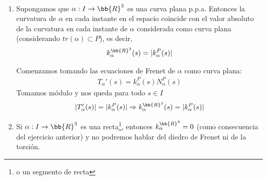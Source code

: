 \begin{ejercicio}\
    \begin{enumerate}
        \item Supongamos que $\alpha : I \to \bb{R}^3$ es una curva plana p.p.a. Entonces la curvatura de $\alpha$ en cada instante en el espacio coincide con el valor absoluto de la curvatura en cada instante de $\alpha$ considerada como curva plana (considerando $tr(\alpha)\subset P$), es decir, 
        \begin{gather*}
            k^{\bb{R}^3}_\alpha(s) = |k_\alpha^P(s)|
        \end{gather*}

        Comenzamos tomando las ecuaciones de Frenet de $\alpha$ como curva plana:
        \begin{gather*}
            T_\alpha'(s) = k_\alpha^P(s)N_\alpha^P(s)
        \end{gather*}
        Tomamos módulo y nos queda para todo $s\in I$
        \begin{gather*}
            |T'_\alpha (s)| = |k_\alpha^P(s)| \Rightarrow k^{\bb{R}^3}_\alpha(s) = |k_\alpha^P(s)|
        \end{gather*}

        \item Si $\alpha:I\to \bb{R}^3$ es una recta\footnote{o un segmento de recta}, entonces $k_\alpha^{\bb{R}^3} = 0$ (como consecuencia del ejercicio anterior) y no podremos hablar del diedro de Frenet ni de la torsión.
        

\end{enumerate}
\end{ejercicio}
